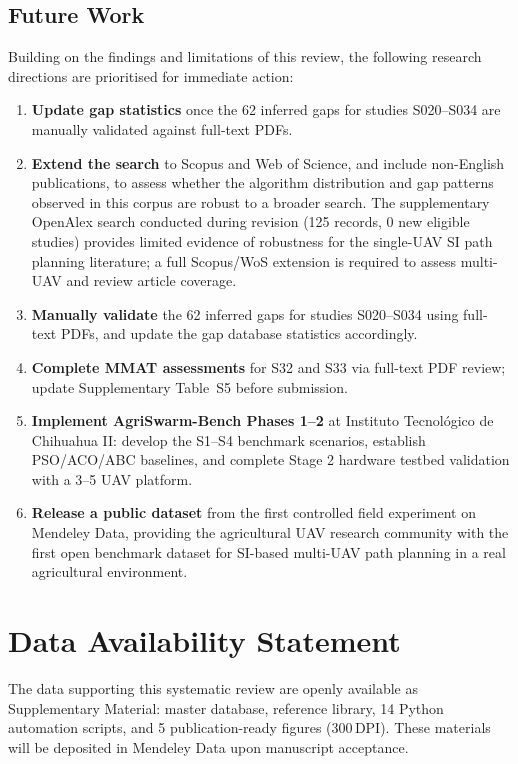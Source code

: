 \documentclass[review,3p,times]{elsarticle}
\begin{document}
\subsection{Future Work}

Building on the findings and limitations of this review, the following research directions are prioritised for immediate action:

\begin{enumerate}
  \item \textbf{Update gap statistics} once the 62 inferred gaps for studies 
S020--S034 are manually validated against full-text PDFs.
  \item \textbf{Extend the search} to Scopus and Web of Science, and include non-English publications, to assess whether the algorithm distribution and gap patterns observed in this corpus are robust to a broader search. The supplementary OpenAlex search conducted during revision (125 records, 0 new eligible studies) provides limited evidence of robustness for the single-UAV SI path planning literature; a full Scopus/WoS extension is required to assess multi-UAV and review article coverage.
  \item \textbf{Manually validate} the 62 inferred gaps for studies S020--S034 using full-text PDFs, and update the gap database statistics accordingly.
  \item \textbf{Complete MMAT assessments} for S32 and S33 via full-text PDF review; update Supplementary Table~S5 before submission.
  \item \textbf{Implement AgriSwarm-Bench Phases 1--2} at Instituto Tecnológico de Chihuahua II: develop the S1--S4 benchmark scenarios, establish PSO/ACO/ABC baselines, and complete Stage 2 hardware testbed validation with a 3--5 UAV platform.
  \item \textbf{Release a public dataset} from the first controlled field experiment on Mendeley Data, providing the agricultural UAV research community with the first open benchmark dataset for SI-based multi-UAV path planning in a real agricultural environment.
\end{enumerate}


\section*{Data Availability Statement}
The data supporting this systematic review are openly available as Supplementary Material: master database, reference library, 14 Python automation scripts, and 5 publication-ready figures (300\,DPI). These materials will be deposited in Mendeley Data upon manuscript acceptance.
\end{document}

